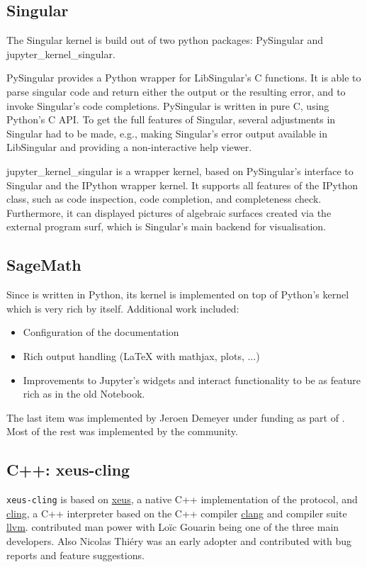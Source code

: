 \documentclass{deliverablereport}
\begin{document}
\subsection{Singular}

The Singular kernel is build out of two python packages: PySingular and jupyter\_kernel\_singular.

PySingular provides a Python wrapper for LibSingular's C functions. It is able to parse singular code and return either the
output or the resulting error, and to invoke Singular's code completions. PySingular is written in pure C, using Python's C API.
To get the full features of Singular, several adjustments in Singular had to be made, e.g., making Singular's error output available
in LibSingular and providing a non-interactive help viewer.

jupyter\_kernel\_singular is a wrapper kernel, based on PySingular's interface to Singular and the IPython wrapper kernel. It supports
all features of the IPython class, such as code inspection, code completion, and completeness check. Furthermore, it can displayed
pictures of algebraic surfaces created via the external program surf, which is Singular's main backend for visualisation.

\subsection{SageMath}

Since \Sage is written in Python, its kernel is implemented on top of Python's kernel which is very rich by itself.
Additional work included:
\begin{itemize}
\item Configuration of the documentation
\item Rich output handling (LaTeX with mathjax, plots, ...)
\item Improvements to Jupyter's widgets and interact functionality to be as feature rich as in the old \Sage Notebook.
\end{itemize}
The last item was implemented by Jeroen Demeyer under \ODK funding as part of .
Most of the rest was implemented by the \Sage community.

\subsection{C++: xeus-cling}

\texttt{xeus-cling} is based on \href{}{xeus}, a native C++ implementation of the \Jupyter protocol, and \href{cling}{cling},
a C++ interpreter based on the C++ compiler \href{}{clang} and compiler suite \href{}{llvm}.
\ODK contributed man power with Loïc Gouarin being one of the three main developers.
Also Nicolas Thiéry was an early adopter and contributed with bug reports and feature suggestions.
\end{document}
